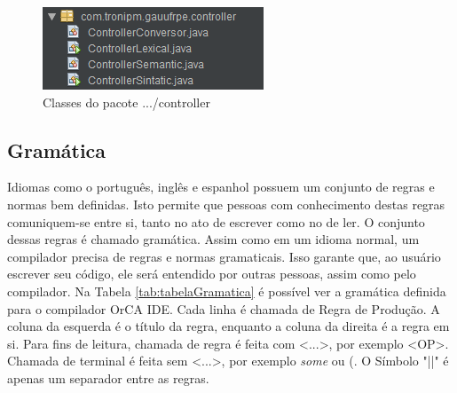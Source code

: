 \documentclass{bcc}
\begin{document}
\begin{figure}[H]
\centering
\includegraphics[width=.7\textwidth]{Figuras/pacote_controller.png}
\caption{Classes do pacote .../controller}
\label{fig:pacotesController}
\end{figure}

\fi

\subsection{Gramática}

Idiomas como o português, inglês e espanhol possuem um conjunto de regras e normas bem definidas. Isto permite que pessoas com conhecimento destas regras comuniquem-se entre si, tanto no ato de escrever como no de ler. O conjunto dessas regras é chamado gramática. Assim como em um idioma normal, um compilador precisa de regras e normas gramaticais. Isso garante que, ao usuário escrever seu código, ele será entendido por outras pessoas, assim como pelo compilador. Na Tabela \ref{tab:tabelaGramatica} é possível ver a gramática definida para o compilador OrCA IDE. Cada linha é chamada de Regra de Produção. A coluna da esquerda é o título da regra, enquanto a coluna da direita é a regra em si. Para fins de leitura, chamada de regra é feita com <...>, por exemplo <OP>. Chamada de terminal é feita sem <...>, por exemplo \textit{some} ou (. O Símbolo "||" é apenas um separador entre as regras.
\end{document}
